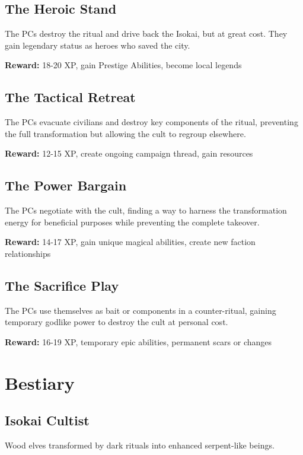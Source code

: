 \documentclass[12pt,twoside]{article}
\begin{document}
\subsection{The Heroic Stand}

The PCs destroy the ritual and drive back the Isokai, but at great cost. They gain legendary status as heroes who saved the city.

\textbf{Reward:} 18-20 XP, gain Prestige Abilities, become local legends

\subsection{The Tactical Retreat}

The PCs evacuate civilians and destroy key components of the ritual, preventing the full transformation but allowing the cult to regroup elsewhere.

\textbf{Reward:} 12-15 XP, create ongoing campaign thread, gain resources

\subsection{The Power Bargain}

The PCs negotiate with the cult, finding a way to harness the transformation energy for beneficial purposes while preventing the complete takeover.

\textbf{Reward:} 14-17 XP, gain unique magical abilities, create new faction relationships

\subsection{The Sacrifice Play}

The PCs use themselves as bait or components in a counter-ritual, gaining temporary godlike power to destroy the cult at personal cost.

\textbf{Reward:} 16-19 XP, temporary epic abilities, permanent scars or changes

\section{Bestiary}

\subsection{Isokai Cultist}

Wood elves transformed by dark rituals into enhanced serpent-like beings.
\end{document}
